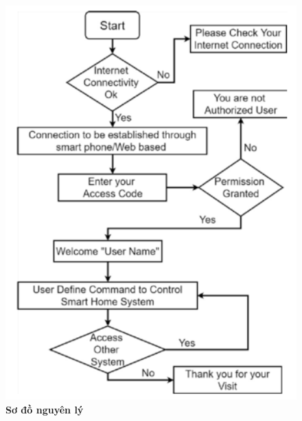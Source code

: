 \documentclass[11pt]{beamer}
\renewcommand{\label}[1]{%
			\gdef\sfname{sf:##1}}%
\begin{document}
\begin{frame}[c]{}
\begin{columns}
		\begin{column}{0.45\textwidth} 
			\begin{figure}[h]
				\includegraphics[width=1\textwidth]{Image/Fig. 3 Diagram.png}
				\caption{\centering \textbf{Sơ đồ nguyên lý}}
			\end{figure}			
		\end{column}
	\end{columns}
	
\end{frame}

\end{document}

